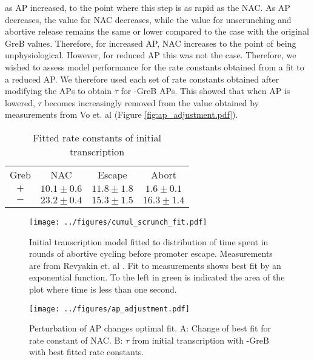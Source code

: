 as AP increased, to the point where this step is as rapid as the NAC. As AP
decreases, the value for NAC decreases, while the value for unscrunching and
abortive release remains the same or lower compared to the case with the
original GreB values. Therefore, for increased AP, NAC increases to the point
of being unphysiological. However, for reduced AP this was not the case.
Therefore, we wished to assess model performance for the rate constants
obtained from a fit to a reduced AP. We therefore used each set of rate
constants obtained after modifying the APs to obtain $\tau$ for -GreB APs.
This showed that when AP is lowered, $\tau$ becomes increasingly removed from
the value obtained by measurements from Vo et. al \cite{vo_vitro_2003-1}
(Figure \ref{fig:ap_adjustment.pdf}).

\begin{table}
  \label{tab:param_fit_revyakin}
  \caption{Fitted rate constants of initial transcription}
  \begin{center}
    \begin{tabular}{cccc}
       \toprule
       Greb & NAC & Escape & Abort \\
       $+$ & $10.1 \pm 0.6$ & $11.8 \pm 1.8$ & $1.6 \pm 0.1$ \\
       $-$ & $23.2 \pm 0.4$ & $15.3 \pm 1.5$ & $16.3 \pm 1.4$ \\
    \end{tabular}
  \end{center}
\end{table}


\begin{figure}
    \begin{center}
      \texttt{[image: ../figures/cumul\_scrunch\_fit.pdf]}
    \end{center}
    \caption{Initial transcription model fitted to distribution of time spent
      in rounds of abortive cycling before promoter escape. Measurements are
      from Revyakin et. al \cite{revyakin_abortive_2006}. Fit to measurements
      shows best fit by an exponential function. To the left in green is
      indicated the area of the plot where time is less than one second.}
\label{fig:revyakin_fit}
\end{figure}


\begin{figure}
    \begin{center}
        \texttt{[image: ../figures/ap\_adjustment.pdf]}
    \end{center}
    \caption{Perturbation of AP changes optimal fit. A: Change of best fit
      for rate constant of NAC. B: $\tau$ from initial transcription with
    -GreB with best fitted rate constants.}
\label{fig:ap_adjustment}
\end{figure}


